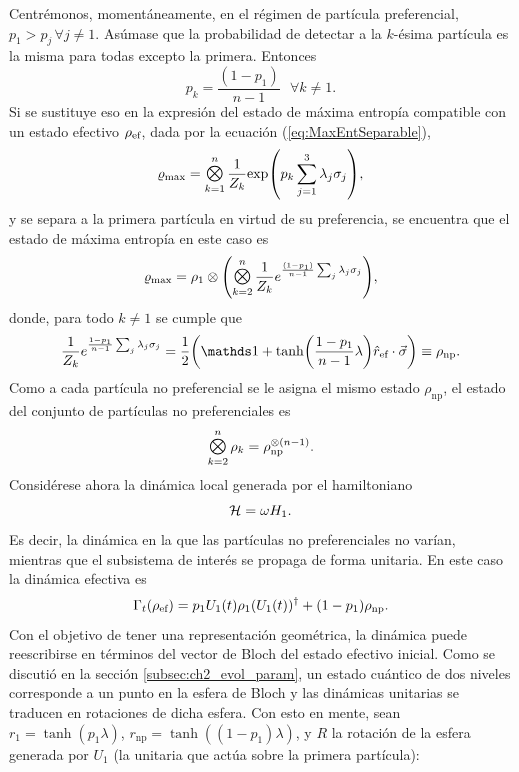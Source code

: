 Centrémonos, momentáneamente, en el régimen de partícula preferencial, \ie{} $p_{1}>p_{j}\,\forall j\neq 1$. Asúmase que la probabilidad de detectar a la $k$-ésima partícula es la misma para todas excepto la primera. Entonces
\begin{equation}
    p_{k}=\frac{(1-p_{1})}{n-1}\text{ }\forall k\neq 1.\nonumber
\end{equation}
Si se sustituye eso en la expresión del estado de máxima entropía compatible con un estado efectivo $\rho_{\text{ef}}$, dada por la ecuación (\ref{eq:MaxEntSeparable}),
\begin{equation}
    \varrho_{\max}=\Motimes_{k=1}^{n}\frac{1}{Z_{k}}\text{exp}\qty(p_{k}\sum_{j=1}^{3}\lambda_{j}\sigma_{j}),\nonumber
\end{equation}
y se separa a la primera partícula en virtud de su preferencia, se encuentra que el estado de máxima entropía en este caso es
\begin{equation}
    \varrho_{\max}=\rho_{1}\otimes\qty(\Motimes_{k=2}^{n}\frac{1}{Z_{k}}e^{\frac{(1-p_{1})}{n-1}\sum_{j}\lambda_{j}\pauli{j}}),\nonumber
\end{equation}
donde, para todo $k\neq 1$ se cumple que
\begin{equation}
    \frac{1}{Z_{k}}e^{\frac{1-p_{1}}{n-1}\sum_{j}\lambda_{j}\pauli{j}}=\frac{1}{2}\qty(\Id+\tanh(\frac{1-p_{1}}{n-1}\lambda)\hat{r}_{\ef}\cdot\vec{\sigma})\equiv \rho_{\text{np}}.\nonumber
\end{equation}
Como a cada partícula no preferencial se le asigna el mismo estado $\rho_{\text{np}}$, el estado del conjunto de partículas no preferenciales es
\begin{equation}
    \Motimes_{k=2}^{n}\rho_{k}=\rho_{\text{np}}^{\otimes(n-1)}\nonumber.
\end{equation}
Considérese ahora la dinámica local generada por el hamiltoniano
\begin{equation}
    \mathcal{H}=\omega H_{1}.\nonumber
\end{equation}
Es decir, la dinámica en la que las partículas no preferenciales no varían, mientras que el subsistema de interés se propaga de forma unitaria. En este caso la dinámica efectiva es
\begin{equation}
    \Gamma_{t}(\rho_{\text{ef}})=p_{1}U_{1}(t)\rho_{1}(U_{1}(t))^{\dag}+(1-p_{1})\rho_{\text{np}}.\nonumber
\end{equation}
Con el objetivo de tener una representación geométrica, la dinámica puede reescribirse en términos del vector de Bloch del estado efectivo inicial. Como se discutió en la sección \ref{subsec:ch2_evol_param}, un estado cuántico de dos niveles corresponde a un punto en la esfera de Bloch y las dinámicas unitarias se traducen en rotaciones de dicha esfera. Con esto en mente, sean $r_{1}=\tanh(p_{1}\lambda)$, $r_{\text{np}}=\tanh((1-p_{1})\lambda)$, y $R$ la rotación de la esfera generada por $U_{1}$ (la unitaria que actúa sobre la primera partícula):
